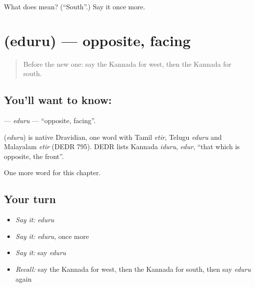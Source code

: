 \begin{tcolorbox}[breakable,colback=teal!4,colframe=teal!35!black,title={Before you move on}]
What does  mean? (\textquotedblleft{}South\textquotedblright{}.) Say it once more.
\end{tcolorbox}
\section[\texorpdfstring{\kn{ಎದುರು} (eduru)}{ಎದುರು (eduru)}]{ (eduru) — opposite, facing}

\label{lesson:KA-C249-eduru}



\begin{quote}
Before the new one: say the Kannada for west, then the Kannada for south.
\end{quote}

\subsection*{You'll want to know: }
\textbf{} — \emph{eduru} — \textquotedblleft{}opposite, facing\textquotedblright{}.

\begin{cousinweb}
\textbf{} (\emph{eduru}) is native Dravidian, one word with Tamil \emph{etir}, Telugu \emph{eduru} and Malayalam \emph{etir} (DEDR 795). DEDR lists Kannada \emph{iduru}, \emph{edur}, \textquotedblleft{}that which is opposite, the front\textquotedblright{}.
\end{cousinweb}

\begin{grammarlens}[title={What you've built}]
One more word for this chapter.
\end{grammarlens}

\subsection*{Your turn}
\begin{itemize}
\raggedright
  \item \emph{Say it:} \emph{eduru}
  \item \emph{Say it:} \emph{eduru}, once more
  \item \emph{Say it:} say \emph{eduru}
  \item \emph{Recall:} say the Kannada for west, then the Kannada for south, then say \emph{eduru} again
\end{itemize}

